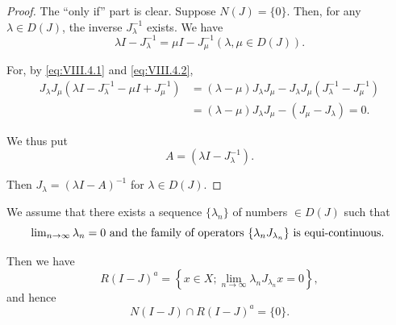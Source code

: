 \begin{proof}
 The ``only if'' part is clear. Suppose $N(J) = \{0\}$. Then, for any $\lambda \in D(J)$, the inverse $J_{\lambda}^{-1}$ exists. We have 
\begin{equation}\label{eq:VIII.4.3}
\lambda I - J _{\lambda} ^{-1} = \mu I - J _{\mu} ^{-1} (\lambda , \mu \in D (J)). \end{equation}

For, by \eqref{eq:VIII.4.1} and \eqref{eq:VIII.4.2}, 
\[
\begin{aligned} J _{\lambda} J _{\mu} (\lambda I - J _{\lambda} ^{-1} - \mu I + J _{\mu} ^{-1}) & = (\lambda - \mu) J _{\lambda} J _{\mu} - J _{\lambda} J _{\mu} (J _{\lambda} ^{-1} - J _{\mu} ^{-1}) \\ & = (\lambda - \mu) J _{\lambda} J _{\mu} - (J _{\mu} - J _{\lambda}) = 0. \end{aligned}
\]

We thus put 
\begin{equation}\label{eq:VIII.4.4}
A = (\lambda I - J _{\lambda} ^{-1}).
\end{equation}

Then $J_{\lambda} = (\lambda I - A)^{-1}$ for $\lambda \in D(J)$. 
\end{proof}
\begin{lemma}\label{lem:VIII.4.Lemma.1} We assume that there exists a sequence $\{\lambda_n\}$ of numbers $\in D(J)$ such that 
\begin{equation}
\label{eq:VIII.4.5}
\begin{minipage}{0.92\linewidth}
\everymath{}\let\limits\nolimits
$\lim\limits_{n\to \infty}\lambda_n = 0$ and the family of operators $\{\lambda_nJ_{\lambda_n}\}$ is equi-continuous.
\end{minipage}
\end{equation}
\end{lemma}


Then we have 
\begin{equation}\label{eq:VIII.4.6}
R (I - J) ^{a} = \left\{x \in X; \lim\limits _{n \rightarrow \infty} \lambda_{n} J _ {\lambda_{n}} x = 0 \right\},
\end{equation}
and hence 
\begin{equation}\label{eq:VIII.4.7}
N (I - J) \cap R (I - J) ^{a} = \{0 \}.
\end{equation}


